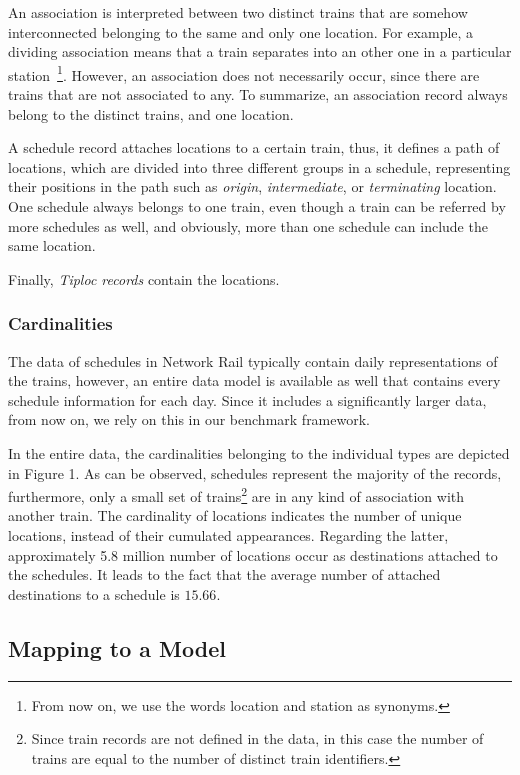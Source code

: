 An association is interpreted between two distinct trains that are somehow interconnected belonging to the same and only one location. For example, a dividing association means that a train separates into an other one in a particular station~\footnote{From now on, we use the words location and station as synonyms.}. However, an association does not necessarily occur, since there are trains that are not associated to any. To summarize, an association record always belong to the distinct trains, and one location.

A schedule record attaches locations to a certain train, thus, it defines a path of locations, which are divided into three different groups in a schedule, representing their positions in the path such as \textit{origin}, \textit{intermediate}, or \textit{terminating} location. One schedule always belongs to one train, even though a train can be referred by more schedules as well, and obviously, more than one schedule can include the same location.

Finally, \textit{Tiploc records} contain the locations.

\subsubsection{Cardinalities}

The data of schedules in Network Rail typically contain daily representations of the trains, however, an entire data model is available as well that contains every schedule information for each day. Since it includes a significantly larger data, from now on, we rely on this in our benchmark framework.

In the entire data, the cardinalities belonging to the individual types are depicted in Figure 1. %
As can be observed, schedules represent the majority of the records, furthermore, only a small set of trains\footnote{Since train records are not defined in the data, in this case the number of trains are equal to the number of distinct train identifiers.} are in any kind of association with another train. The cardinality of locations indicates the number of unique locations, instead of their cumulated appearances. Regarding the latter, approximately 5.8 million number of locations occur as destinations attached to the schedules. It leads to the fact that the average number of attached destinations to a schedule is $15.66$.

\subsection{Mapping to a Model}\label{sec:mapping_schedule}

